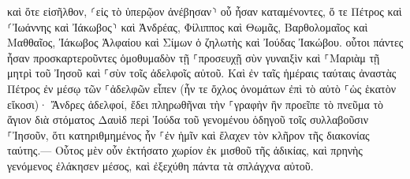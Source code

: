 \documentclass{openreader}
\begin{document}
καὶ ὅτε εἰσῆλθον, ⸂εἰς τὸ ὑπερῷον ἀνέβησαν⸃ οὗ ἦσαν καταμένοντες, ὅ τε Πέτρος καὶ ⸂Ἰωάννης καὶ Ἰάκωβος⸃ καὶ Ἀνδρέας, Φίλιππος καὶ Θωμᾶς, Βαρθολομαῖος καὶ Μαθθαῖος, Ἰάκωβος Ἁλφαίου καὶ Σίμων ὁ ζηλωτὴς καὶ Ἰούδας Ἰακώβου. 
οὗτοι πάντες ἦσαν προσκαρτεροῦντες ὁμοθυμαδὸν τῇ ⸀προσευχῇ σὺν γυναιξὶν καὶ ⸀Μαριὰμ τῇ μητρὶ τοῦ Ἰησοῦ καὶ ⸀σὺν τοῖς ἀδελφοῖς αὐτοῦ. 
Καὶ ἐν ταῖς ἡμέραις ταύταις ἀναστὰς Πέτρος ἐν μέσῳ τῶν ⸀ἀδελφῶν εἶπεν (ἦν τε ὄχλος ὀνομάτων ἐπὶ τὸ αὐτὸ ⸀ὡς ἑκατὸν εἴκοσι)· 
Ἄνδρες ἀδελφοί, ἔδει πληρωθῆναι τὴν ⸀γραφὴν ἣν προεῖπε τὸ πνεῦμα τὸ ἅγιον διὰ στόματος Δαυὶδ περὶ Ἰούδα τοῦ γενομένου ὁδηγοῦ τοῖς συλλαβοῦσιν ⸀Ἰησοῦν, 
ὅτι κατηριθμημένος ἦν ⸀ἐν ἡμῖν καὶ ἔλαχεν τὸν κλῆρον τῆς διακονίας ταύτης.— 
Οὗτος μὲν οὖν ἐκτήσατο χωρίον ἐκ μισθοῦ τῆς ἀδικίας, καὶ πρηνὴς γενόμενος ἐλάκησεν μέσος, καὶ ἐξεχύθη πάντα τὰ σπλάγχνα αὐτοῦ. 
\end{document}
